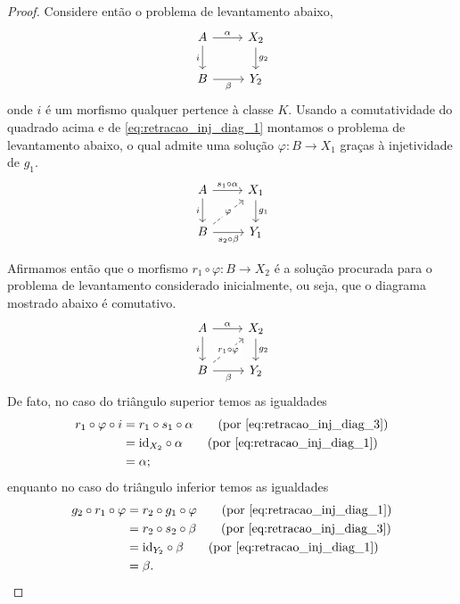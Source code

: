 \begin{proof}
  Considere então o problema de levantamento abaixo,
  \begin{displaymath}
    \begin{tikzcd}
      A
      \arrow[r, "\alpha"]
      \arrow[d, "i" swap]
      & X_2
      \arrow[d, "g_2"]
      \\ B
      \arrow[r, "\beta" swap]
      & Y_2
    \end{tikzcd}
  \end{displaymath}
  onde $i$ é um morfismo qualquer pertence à classe $K$.
  Usando a comutatividade do quadrado acima e de \eqref{eq:retracao_inj_diag_1} montamos o problema de levantamento abaixo, o qual admite uma solução $\varphi: B \to X_1$ graças à injetividade de $g_1$.
  \begin{equation}\label{eq:retracao_inj_diag_3}
    \begin{tikzcd}
      A
      \arrow[r, "s_1 \circ \alpha"]
      \arrow[d, "i" swap]
      & X_1
      \arrow[d, "g_1"]
      \\ B
      \arrow[r, "s_2 \circ \beta" swap]
      \arrow[ru, dashed, "\varphi" description]
      & Y_1
    \end{tikzcd}
  \end{equation}

  Afirmamos então que o morfismo $r_1 \circ \varphi: B \to X_2$ é a solução procurada para o problema de levantamento considerado inicialmente, ou seja, que o diagrama mostrado abaixo é comutativo.
  \begin{displaymath}
    \begin{tikzcd}
      A
      \arrow[r, "\alpha"]
      \arrow[d, "i" swap]
      & X_2
      \arrow[d, "g_2"]
      \\ B
      \arrow[r, "\beta" swap]
      \arrow[ru, dashed, "r_1 \circ \varphi" description]
      & Y_2
    \end{tikzcd}
  \end{displaymath}
  De fato, no caso do triângulo superior temos as igualdades
  \begin{align*}
    r_1 \circ \varphi \circ i
    & = r_1 \circ s_1 \circ \alpha
    \tag{por \eqref{eq:retracao_inj_diag_3}} \\
    & = \id_{X_2} \circ \alpha
    \tag{por \eqref{eq:retracao_inj_diag_1}} \\
    & = \alpha;
  \end{align*}
  enquanto no caso do triângulo inferior temos as igualdades
  \begin{align*}
    g_2 \circ r_1 \circ \varphi
    & = r_2 \circ g_1 \circ \varphi
    \tag{por \eqref{eq:retracao_inj_diag_1}} \\
    & = r_2 \circ s_2 \circ \beta
    \tag{por \eqref{eq:retracao_inj_diag_3}} \\
    & = \id_{Y_2} \circ \beta
    \tag{por \eqref{eq:retracao_inj_diag_1}} \\
    & = \beta.
  \end{align*}


\end{proof}
